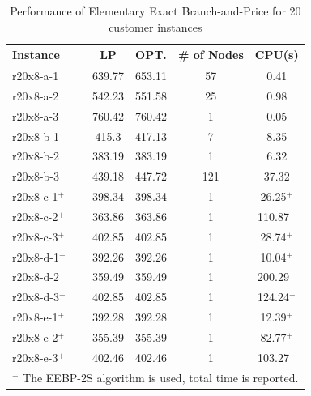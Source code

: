 \begin{table}[ht]
\centering
\caption{Performance of Elementary Exact Branch-and-Price for 20 customer instances}\label{gr3-20}
\begin {tabular}[t]{|l|c|c|c|c|}  
\hline
Instance & LP & OPT. & \# of Nodes & CPU(s) \\\hline
r20x8-a-1 \ \	&	639.77	&	653.11	&	57	&	0.41	\\
r20x8-a-2 \ \	&	542.23	&	551.58	&	25	&	0.98	\\
r20x8-a-3 \ \	&	760.42	&	760.42	&	1	&	0.05	\\
r20x8-b-1 \ \	&	415.3	&	417.13	&	7	&	8.35	\\
r20x8-b-2 \ \	&	383.19	&	383.19	&	1	&	6.32	\\
r20x8-b-3 \ \	&	439.18	&	447.72	&	121	&	37.32	\\
r20x8-c-1$^+$ \ \	&	398.34	&	398.34	&	1	&	26.25$^+$	\\
r20x8-c-2$^+$ \ \	&	363.86	&	363.86	&	1	&	110.87$^+$	\\
r20x8-c-3$^+$ \ \	&	402.85	&	402.85	&	1	&	28.74$^+$	\\
r20x8-d-1$^+$ \ \	&	392.26	&	392.26	&	1	&	10.04$^+$	\\
r20x8-d-2$^+$ \ \	&	359.49	&	359.49	&	1	&	200.29$^+$	\\
r20x8-d-3$^+$ \ \	&	402.85	&	402.85	&	1	&	124.24$^+$	\\
r20x8-e-1$^+$ \ \	&	392.28	&	392.28	&	1	&	12.39$^+$	\\
r20x8-e-2$^+$ \ \	&	355.39	&	355.39	&	1	&	82.77$^+$	\\
r20x8-e-3$^+$ \ \	&	402.46	&	402.46	&	1	&	103.27$^+$	\\
\hline
\multicolumn{5}{l}{$^+$ The EEBP-2S algorithm is used, total time is reported.}\\
\end{tabular}
\end{table} 


